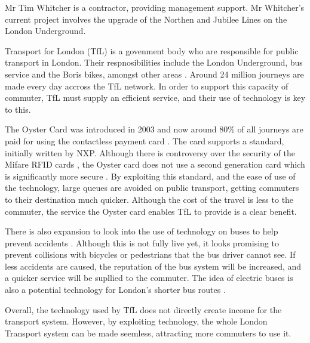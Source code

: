 {}

Mr Tim Whitcher is a contractor, providing management support.
Mr Whitcher's current project involves the upgrade of the Northen and Jubilee Lines on the London Underground. 

Transport for London (TfL) is a govenment body who are responsible for public transport in London.
Their respnosibilities include the London Underground, bus service and the Boris bikes, amongst other areas \cite{tfl:about}.
Around 24 million journeys are made every day accross the TfL network.
In order to support this capacity of commuter, TfL must supply an efficient service, and their use of technology is key to this.

The Oyster Card was introduced in 2003 and now around 80\% of all journeys are paid for using the contactless payment card \cite{oyster:wiki}. 
The card supports a standard, initially written by NXP. 
Although there is controversy over the security of the Mifare RFID cards \cite{molnar2004privacy}, the Oyster card does not use a second generation card which is significantly more secure \cite{rfid:security}. 
By exploiting this standard, and the ease of use of the technology, large queues are avoided on public transport, getting commuters to their destination much quicker. 
Although the cost of the travel is less to the commuter, the service the Oyster card enables TfL to provide is a clear benefit.

There is also expansion to look into the use of technology on buses to help prevent accidents \cite{tfl:bus}. 
Although this is not fully live yet, it looks promising to prevent collisions with bicycles or pedestrians that the bus driver cannot see.
If less accidents are caused, the reputation of the bus system will be increased, and a quicker service will be supllied to the commuter.
The idea of electric buses is also a potential technology for London's shorter bus routes \cite{guardian:bus}.

Overall, the technology used by TfL does not directly create income for the transport system.
However, by exploiting technology, the whole London Transport system can be made seemless, attracting more commuters to use it.
